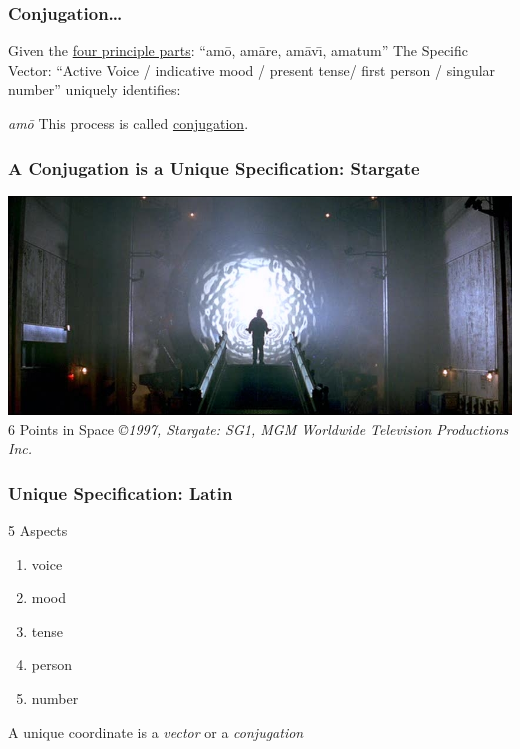 \documentclass[slidestop,compress,mathserif]{beamer}
\begin{document}
\begin{frame}
	\frametitle{Conjugation\ldots}
	Given the \underline{four principle parts}:  ``am\={o}, am\={a}re, am\={a}v\={\i}, amatum''
	\vskip 0.5cm
	The Specific Vector: ``Active Voice / indicative mood / present tense/ first person / singular number'' uniquely identifies:
	\vskip 0.5cm
	\begin{center}
		\emph{am\={o}}
		\vskip 0.5cm
		This process is called \underline{conjugation}.
	\end{center}
\end{frame}

\begin{frame}
	\frametitle{A Conjugation is a Unique Specification:  Stargate}
	\begin{center}
		\includegraphics[scale=0.25]{img/stargate.jpg}
		\vskip 0.5cm
		6 Points in Space
		\vskip 0.5cm
		\tiny
		\emph{\copyright 1997, \emph{Stargate:  SG1},  MGM Worldwide Television Productions Inc.}
		\normalsize
	\end{center}
\end{frame}

\begin{frame}
	\frametitle{Unique Specification:  Latin}
	5 Aspects
	\begin{enumerate}
		\item voice
		\pause
		\item mood
		\pause
		\item tense
		\pause
		\item person
		\pause
		\item number
		\pause
	\end{enumerate}
	\vskip 0.5cm
	A unique coordinate is a \emph{vector} or a \emph{conjugation}
\end{frame}
\end{document}
